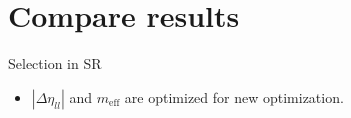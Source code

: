 \documentclass[mathserif,serif]{beamer}
\begin{document}
\section{Compare results}
\begin{frame}{Selection in SR}
\tiny
\begin{itemize}
\item $|\Delta\eta_{ll}|$ and $m_{\text{eff}}$ are optimized for new optimization.
\end{itemize}

\begin{table}[htbp]
\centering
\tiny

\begin{columns}

\begin{column}{0.5\textwidth}
\scalebox{0.8}{

\end{tabular}
}
\caption{\tiny SR optimization with MC only}
\end{column}

\end{columns}

\begin{columns}

\begin{column}{0.5\textwidth}
\scalebox{0.8}{

\end{tabular}
}
\caption{\tiny SR optimization with DD}
\end{column}

\end{columns}
\end{table}
\end{frame}
\end{document}
